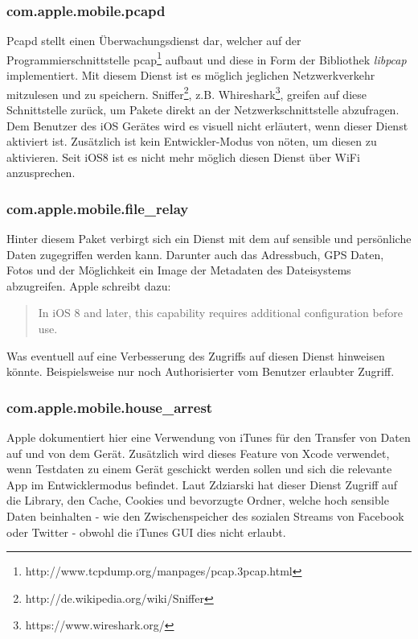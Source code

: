 		\subsubsection{com.apple.mobile.pcapd}
			Pcapd stellt einen Überwachungsdienst dar, welcher auf der
			Programmierschnittstelle
			pcap\footnote{http://www.tcpdump.org/manpages/pcap.3pcap.html} aufbaut und
			diese in Form der Bibliothek \textsl{libpcap} implementiert. Mit diesem
			Dienst ist es möglich jeglichen Netzwerkverkehr mitzulesen und zu speichern.
			Sniffer\footnote{http://de.wikipedia.org/wiki/Sniffer}, z.B.
			Whireshark\footnote{https://www.wireshark.org/}, greifen auf diese
			Schnittstelle zurück, um Pakete direkt an der Netzwerkschnittstelle
			abzufragen. Dem Benutzer des iOS Gerätes wird es visuell nicht erläutert,
			wenn dieser Dienst aktiviert ist. Zusätzlich ist kein Entwickler-Modus von
			nöten, um diesen zu aktivieren. Seit iOS8 ist es nicht mehr möglich diesen
			Dienst über WiFi anzusprechen.
		\subsubsection{com.apple.mobile.file\_relay}
			Hinter diesem Paket verbirgt sich ein Dienst mit dem auf sensible und
			persönliche Daten zugegriffen werden kann. Darunter auch das Adressbuch, GPS
			Daten, Fotos und der Möglichkeit ein Image der Metadaten des Dateisystems
			abzugreifen. Apple schreibt dazu:
			\begin{quote}
				In iOS 8 and later, this capability requires additional configuration before
				use.
			\end{quote}
			Was eventuell auf eine Verbesserung des Zugriffs auf diesen Dienst hinweisen
			könnte. Beispielsweise nur noch Authorisierter vom Benutzer erlaubter
			Zugriff.
		\subsubsection{com.apple.mobile.house\_arrest}
			Apple dokumentiert hier eine Verwendung von iTunes für den Transfer von Daten
			auf und von dem Gerät. Zusätzlich wird dieses Feature von Xcode verwendet,
			wenn Testdaten zu einem Gerät geschickt werden sollen und sich die relevante
			App im Entwicklermodus befindet. Laut Zdziarski hat dieser Dienst Zugriff auf
			die Library, den Cache, Cookies und bevorzugte Ordner, welche hoch sensible
			Daten beinhalten - wie den Zwischenspeicher des sozialen Streams von Facebook
			oder Twitter - obwohl die iTunes GUI dies nicht erlaubt.
			
